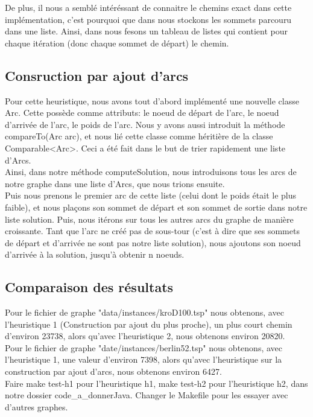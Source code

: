 \documentclass[a4paper,11pt]{article}
\begin{document}
De plus, il nous a semblé intéréssant de connaitre le chemins exact dans cette implémentation, c'est pourquoi que dans  nous stockons les sommets parcouru dans une liste. Ainsi, dans  nous fesons un tableau de listes qui contient pour chaque itération (donc chaque sommet de départ) le chemin.


\subsection{Consruction par ajout d'arcs}
\indent Pour cette heuristique, nous avons tout d'abord implémenté une nouvelle classe Arc.
Cette possède comme attributs: le noeud de départ de l'arc, le noeud d'arrivée de l'arc, le poids de l'arc. Nous y avons aussi introduit la méthode compareTo(Arc arc), et nous lié cette classe comme héritière de la classe Comparable<Arc>. Ceci a été fait dans le but de trier rapidement une liste d'Arcs.
\\
Ainsi, dans notre méthode computeSolution, nous introduisons tous les arcs de notre graphe dans une liste d'Arcs, que nous trions ensuite.
\\
Puis nous prenons le premier arc de cette liste (celui dont le poids était le plus faible), et nous plaçons son sommet de départ et son sommet de sortie dans notre liste solution. Puis, nous itérons sur tous les autres arcs du graphe de manière croissante. Tant que l'arc ne créé pas de sous-tour (c'est à dire que ses sommets de départ et d'arrivée ne sont pas notre liste solution), nous ajoutons son noeud d'arrivée à la solution, jusqu'à obtenir n noeuds.


\subsection{Comparaison des résultats}
\indent Pour le fichier de graphe "data/instances/kroD100.tsp" nous obtenons, avec l'heuristique 1 (Construction par ajout du plus proche), un plus court chemin d'environ 23738, alors qu'avec l'heuristique 2, nous obtenons environ 20820. \\
\indent Pour le fichier de graphe "date/instances/berlin52.tsp" nous obtenons, avec l'heuristique 1, une valeur d'environ 7398, alors qu'avec l'heuristique sur la construction par ajout d'arcs, nous obtenons environ 6427. \\
\indent Faire make test-h1 pour l'heuristique h1, make test-h2 pour l'heuristique h2, dans notre dossier code\_a\_donnerJava. Changer le Makefile pour les essayer avec d'autres graphes.
\end{document}
